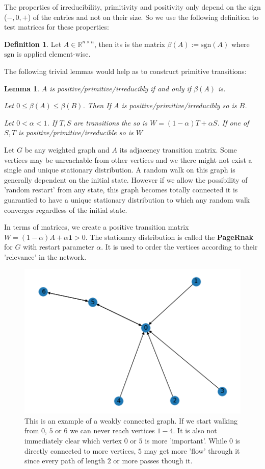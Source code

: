 \documentclass[a4paper,10pt]{article}
\newcommand{\R}{\mathbb{R}}
\newcommand{\gt}{>}
\newcommand{\lt}{<}
\theoremstyle{definition}
\newtheorem{mydef}{Definition}[section]
\theoremstyle{remark}
\theoremstyle{plain}
\newtheorem{lemma}{Lemma}[section]
\begin{document}
The properties of irreducibility, primitivity and positivity only depend on the
sign ($-,0,+$) of the entries and not on their size. So we use the following definition to
test matrices for these properties:

\begin{mydef}
Let $A \in \R^{n \times n}$, then its  is the matrix
$\beta(A) := \text{sgn}(A)$ where $\text{sgn}$ is applied element-wise.
\end{mydef}

The following trivial lemmas would help as to construct primitive transitions:

\begin{lemma}
$A$ is positive/primitive/irreducibly if
and only if $\beta(A)$ is.

Let $0 \leq \beta(A) \leq \beta(B)$.
Then If $A$ is positive/primitive/irreducibly so is $B$.

Let $0 \lt \alpha \lt 1$. If $T,S$ are transitions the so is $W=(1-\alpha)T +
\alpha S$.
If one of $S,T$ is positive/primitive/irreducible so is $W$
\end{lemma}

Let $G$ be any weighted graph and $A$ its adjacency transition matrix. Some vertices may
be unreachable from other vertices and we there might not exist a single and
unique stationary distribution. A random walk on this graph is generally
dependent on the initial state.
However if we allow the possibility of 'random restart' from any state, this
graph becomes totally connected it is guarantied to have a unique stationary
distribution to which any random walk converges regardless of the initial state.

In terms of matrices, we create a positive transition matrix $W = (1-\alpha)A + \alpha
\mathbf{1} \gt 0$. The stationary distribution is called the \textbf{PageRnak}
for $G$ with restart parameter $\alpha$. It is used to order the vertices
according to their 'relevance' in the network.


\begin{figure}[!htb]
  \centering
    \includegraphics[width=0.55\linewidth]{directed_graph_example_unranked.png}
  \caption{This is an example of a weakly connected graph. If we start walking
  from $0$, $5$ or $6$ we can never reach vertices $1-4$. It is also not immediately
  clear which vertex $0$ or $5$ is more 'important'. While $0$ is directly
  connected to more vertices, $5$ may get more 'flow' through it since every
  path of length $2$ or more passes though it.}
  \label{fig:weaklyconnected}
\end{figure}
\end{document}
